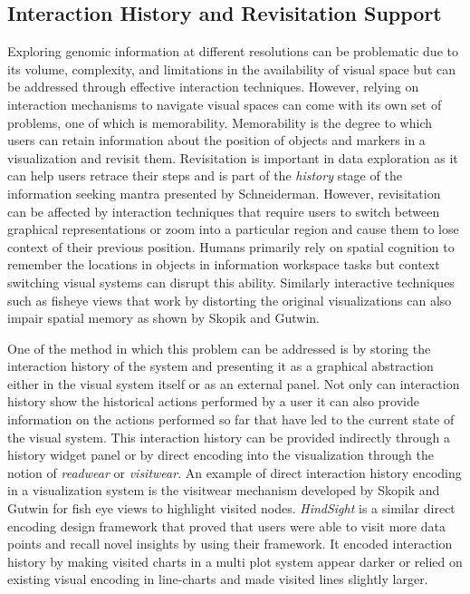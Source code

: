 \subsection{Interaction History and Revisitation Support}

Exploring genomic information at different resolutions can be problematic due to its volume, complexity, and limitations in the availability of visual space but can be addressed through effective interaction techniques. However, relying on interaction mechanisms to navigate visual spaces can come with its own set of problems, one of which is memorability. Memorability is the degree to which users can retain information about the position of objects and markers in a visualization and revisit them. Revisitation is important in data exploration as it can help users retrace their steps and is part of the \textit{history} stage of the information seeking mantra presented by Schneiderman\cite{Shneiderman96theeyes}. However, revisitation can be affected by interaction techniques that require users to switch between graphical representations or zoom into a particular region and cause them to lose context of their previous position. Humans primarily rely on spatial cognition to remember the locations in objects in information workspace tasks but context switching visual systems can disrupt this ability\cite{datamountain}. Similarly interactive techniques such as fisheye views that work by distorting the original visualizations can also impair spatial memory as shown by Skopik and Gutwin\cite{gutwin2003finding}. 


One of the method in which this problem can be addressed is by storing the interaction history of the system and presenting it as a graphical abstraction either in the visual system itself or as an external panel. Not only can interaction history show the historical actions performed by a user it can also provide information on the actions performed so far that have led to the current state of the visual system. This interaction history can be provided indirectly through a history widget panel or by direct encoding into the visualization through the notion of \textit{readwear} or \textit{visitwear}. An example of  direct interaction history encoding in a visualization system is the visitwear mechanism developed by Skopik and Gutwin for fish eye views to highlight visited nodes. \textit{HindSight} is a similar direct encoding design framework that proved that users were able to visit more data points and recall novel insights by using their framework\cite{feng2016hindsight}. It encoded interaction history by making visited charts in a multi plot system appear darker or relied on existing visual encoding in line-charts and made visited lines slightly larger.

